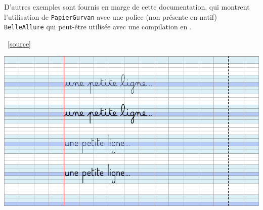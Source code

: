 \documentclass[a4paper]{article}
\begin{document}
D'autres exemples sont fournis en marge de cette documentation, qui montrent l'utilisation de \texttt{PapierGurvan} avec une police (non présente en natif) \texttt{BelleAllure} qui peut-être utilisée avec une compilation en .

\hfill~\href{https://www.dafont.com/fr/belle-allure.font}{[source]}

\begin{center}
	\includegraphics{BelleAllure.pdf}
\end{center}
\end{document}
